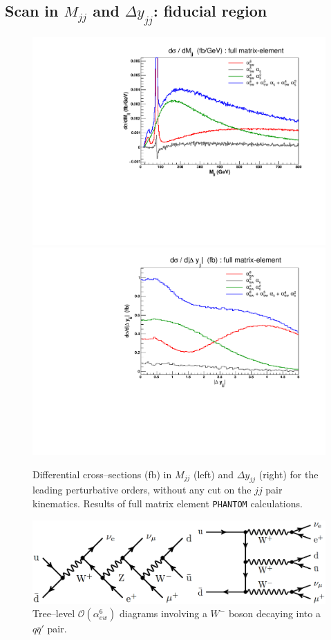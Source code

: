 \subsection{Scan in $M_{jj}$ and $\Delta y_{jj}$: fiducial region}\label{subsec:scan_full}
\begin{figure}[hbt]
\centering
\includegraphics[scale=0.395]{figures/scanfigures/mjj_full.pdf}
\includegraphics[scale=0.395]{figures/scanfigures/dyjj_full.pdf}
\caption{Differential cross--sections (fb) in $M_{jj}$ (left) and $\Delta y_{jj}$ (right) for the leading perturbative orders, without any cut on the $jj$ pair kinematics. Results of full matrix element \texttt{PHANTOM} calculations.} \label{fig:mjjdyjj_1d}
\end{figure}

\begin{figure}[hbt]
\centering %
\includegraphics[scale=0.19]{figures/scanfigures/jjpeak_diag.png}
\caption{Tree--level $\mathcal{O}(\alpha_{ew}^6)$ diagrams involving a $W^-$ boson decaying into a $q\bar{q}'$ pair.} \label{fig:jjpeak_diag}
\end{figure}


